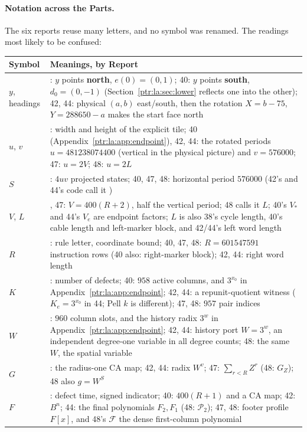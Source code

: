 \documentclass[11pt,letterpaper]{article}
\theoremstyle{definition}\newtheorem{definition}[theorem]{Definition}
\theoremstyle{remark}\newtheorem{remark}[theorem]{Remark}
\newcommand{\code}[1]{\texttt{\detokenize{#1}}}
\begin{document}
\paragraph{Notation across the Parts.} The six reports reuse many letters,
and no symbol was renamed. The readings most likely to be confused:
\begin{center}\small
\begin{longtable}{@{}>{\raggedright\arraybackslash}p{}>{\raggedright\arraybackslash}p{}@{}}
\toprule
Symbol & Meanings, by Report\\
\midrule\endhead
$y$, headings & 38: $y$ points \textbf{north}, $e(0)=(0,1)$; 40: $y$ points \textbf{south}, $d_0=(0,-1)$ (Section~\ref{ptr:la:sec:lower} reflects one into the other); 42, 44: physical $(a,b)$ east/south, then the rotation $X=b-75$, $Y=288650-a$ makes the start face north\\
$u$, $v$ & 38: width and height of the explicit tile; 40 (Appendix~\ref{ptr:la:app:endpoint}), 42, 44: the rotated periods $u=481238074400$ (vertical in the physical picture) and $v=576000$; 47: $u=2V$; 48: $u=2L$\\
$S$ & 38: $4uv$ projected states; 40, 47, 48: horizontal period $576000$ (42's and 44's code call it \code{V})\\
$V$, $L$ & 40, 47: $V=400(R+2)$, half the vertical period; 48 calls it $L$; 40's $V_*$ and 44's $V_e$ are endpoint factors; $L$ is also 38's cycle length, 40's cable length and left-marker block, and 42/44's left word length\\
$R$ & 38: rule letter, coordinate bound; 40, 47, 48: $R=601547591$ instruction rows (40 also: right-marker block); 42, 44: right word length\\
$K$ & 38: number of defects; 40: $958$ active columns, and $3^{x_0}$ in Appendix~\ref{ptr:la:app:endpoint}; 42, 44: a repunit-quotient witness ($K_e=3^{x_0}$ in 44; Pell $k$ is different); 47, 48: $957$ pair indices\\
$W$ & 40: $960$ column slots, and the history radix $3^w$ in Appendix~\ref{ptr:la:app:endpoint}; 42, 44: history port $W=3^w$, an independent degree-one variable in all degree counts; 48: the same $W$, the spatial variable\\
$G$ & 40: the radius-one CA map; 42, 44: radix $W^v$; 47: $\sum_{r<R}Z^r$ (48: $G_Z$); 48 also $g=W^S$\\
$F$ & 38: defect time, signed indicator; 40: $400(R+1)$ and a CA map; 42: $B^n$; 44: the final polynomials $F_2,F_1$ (48: $\mathcal P_2$); 47, 48: footer profile $F[x]$, and 48's $\mathcal F$ the dense first-column polynomial\\

\end{longtable}
\end{center}
\end{document}
